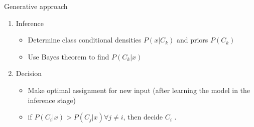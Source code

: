 \documentclass[serif, aspectratio=169]{beamer}
\begin{document}
    \begin{frame}{Generative approach}
        \begin{enumerate}
            \item Inference
            \begin{itemize}
                \item Determine class conditional densities $P(x|C_k)$ and priors $P(C_k)$
                \item Use Bayes theorem to find $P(C_k|x)$
            \end{itemize}
            \item Decision
            \begin{itemize}
                \item Make optimal assignment for new input (after learning the model in the inference stage)
                \item if $P(C_i|x) > P(C_j|x) \forall j \neq i$, then decide $C_i$ .
            \end{itemize}
        \end{enumerate}
    \end{frame}
\end{document}
